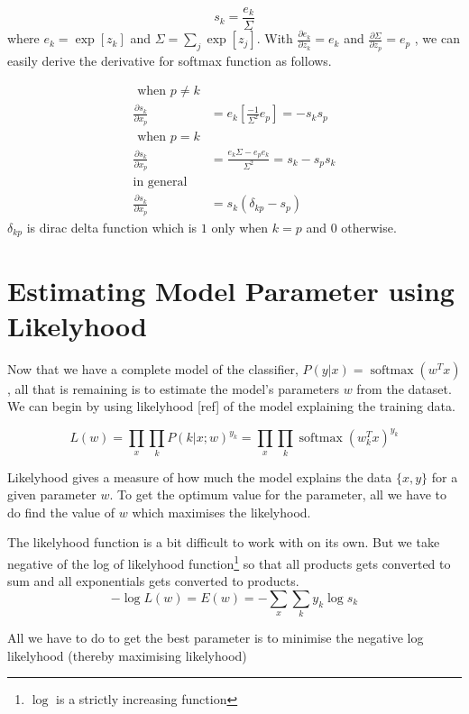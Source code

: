 \documentclass[10pt]{article}
\begin{document}
$$
s_k = \frac{e_k}{\Sigma}
$$
where $e_k = \operatorname{exp}[z_k]$ and $\Sigma = \sum_j\operatorname{exp}[z_j]$. With $\frac{\partial e_k}{\partial z_k} = e_k$ and $\frac{\partial \Sigma}{\partial z_p} = e_p $ , we can easily derive the derivative for softmax function as follows.

$$
\begin{aligned}
\text{ when $p \neq k$}
\\
\frac{\partial s_k}{\partial x_p} &= e_k\left[ \frac{-1}{\Sigma^2} e_p\right] = -s_ks_p
\\
\text{ when $p = k$}
\\
\frac{\partial s_k}{\partial x_p} &= 
\frac{  e_k \Sigma-  e_p e_k}{\Sigma^2} = s_k-s_ps_k
\\
\text{in general}
\\
\frac{\partial s_k}{\partial x_p} &= s_k(\delta_{kp} - s_p)
\end{aligned}
$$
$\delta_{kp}$ is dirac delta function which is $1$ only when $k=p$ and $0$ otherwise.



\section{Estimating Model Parameter using Likelyhood}

Now that we have a complete model of the classifier, $P(y|x) = \operatorname{softmax}(w^Tx) $,  all that is remaining is to estimate the model's parameters $w$ from the dataset. We can begin by using likelyhood [ref] of the model explaining the training data.  

$$
L(w) = \prod_x \prod_k P(k|x;w)^{y_k} = \prod_x \prod_k \operatorname{softmax}(w_k^Tx)^{y_k} 
$$

Likelyhood gives a measure of how much the model explains the data $\{x,y\}$ for a given parameter $w$. To get the optimum value for the parameter, all we have to do find the value of $w$ which maximises the likelyhood. 

The likelyhood function is a bit difficult to work with on its own. But we take negative of the log of likelyhood function\footnote{$\log$ is a strictly increasing function} so that all products gets converted to sum and all exponentials gets converted to products.
$$
-\log L(w) = E(w) = -\sum_x \sum_k y_k \log s_k
$$

All we have to do to get the best parameter is to minimise the negative log likelyhood (thereby maximising likelyhood)
\end{document}
